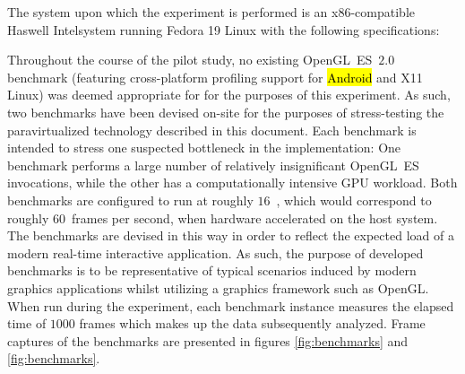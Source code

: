 The system upon which the experiment is performed is an x86-compatible Haswell Intel\circledR system running Fedora 19 Linux with the following specifications:


Throughout the course of the pilot study, no existing OpenGL~ES~$2.0$ benchmark (featuring cross-platform profiling support for \hl{Android} and X11 Linux) was deemed appropriate for for the purposes of this experiment.
As such, two benchmarks have been devised on-site for the purposes of stress-testing the paravirtualized technology described in this document.
Each benchmark is intended to stress one suspected bottleneck in the implementation: One benchmark performs a large number of relatively insignificant OpenGL~ES invocations, while the other has a computationally intensive GPU workload.
Both benchmarks are configured to run at roughly $16$~\milli\second , which would correspond to roughly $60$~frames per second, when hardware accelerated on the host system.
The benchmarks are devised in this way in order to reflect the expected load of a modern real-time interactive application.
As such, the purpose of developed benchmarks is to be representative of typical scenarios induced by modern graphics applications whilst utilizing a graphics framework such as OpenGL.
When run during the experiment, each benchmark instance measures the elapsed time of $1000$ frames which makes up the data subsequently analyzed.
Frame captures of the benchmarks are presented in figures \ref{fig:benchmarks} and \ref{fig:benchmarks}.

